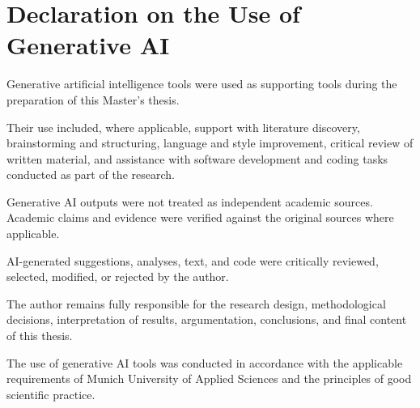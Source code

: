 \documentclass[10pt,a4paper]{article}
\newif\ifconfidential
\begin{document}
\ifconfidential

\newpage

\section*{Confidentiality Notice}

This Master's thesis contains confidential and proprietary information
of SIXT SE.

The thesis is submitted solely for examination purposes at Munich
University of Applied Sciences.

The contents of this thesis, in whole or in part, may not be disclosed,
reproduced, made publicly accessible, or otherwise distributed to third
parties without prior authorization, except where disclosure is required
for examination and administrative purposes by Munich University of
Applied Sciences.

Any further use, publication, reproduction, or disclosure requires the
prior written consent of the relevant parties.

\fi


\newpage

\section*{Declaration on the Use of Generative AI}

Generative artificial intelligence tools were used as supporting tools
during the preparation of this Master's thesis.

Their use included, where applicable, support with literature discovery,
brainstorming and structuring, language and style improvement, critical
review of written material, and assistance with software development
and coding tasks conducted as part of the research.

Generative AI outputs were not treated as independent academic sources.
Academic claims and evidence were verified against the original sources
where applicable.

AI-generated suggestions, analyses, text, and code were critically
reviewed, selected, modified, or rejected by the author.

The author remains fully responsible for the research design,
methodological decisions, interpretation of results, argumentation,
conclusions, and final content of this thesis.

The use of generative AI tools was conducted in accordance with the
applicable requirements of Munich University of Applied Sciences and
the principles of good scientific practice.
\end{document}
